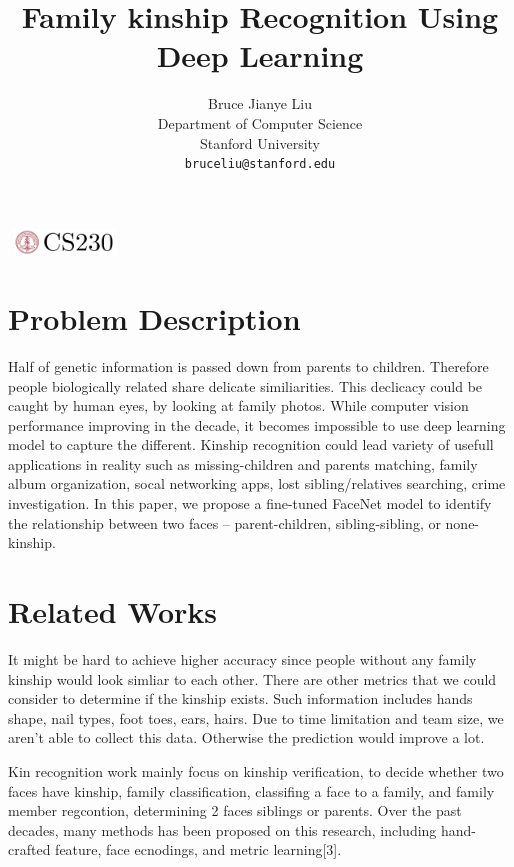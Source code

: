\documentclass{article}
\title{Family kinship Recognition Using Deep Learning}
\author{
  Bruce Jianye Liu\\
  Department of Computer Science\\
  Stanford University\\
  \texttt{bruceliu@stanford.edu} \\
}
\begin{document}

\begin{center}
\includegraphics[width=3cm, height=0.7cm]{CS230}
\end{center}

\maketitle

\section{Problem Description}
Half of genetic information is passed down from parents to children. Therefore
people biologically related share delicate similiarities. This declicacy could
be caught by human eyes, by looking at family photos. While computer vision
performance improving in the decade, it becomes impossible to use deep learning
model to capture the different. Kinship recognition could lead variety of
usefull applications in reality such as missing-children and parents matching,
family album organization, socal networking apps, lost sibling/relatives
searching, crime investigation. In this paper, we propose a fine-tuned FaceNet
model to identify the relationship between two faces -- parent-children, sibling-sibling, or none-kinship.

\section{Related Works}

It might be hard to achieve higher accuracy since people without any family
kinship would look simliar to each other. There are other metrics that we could
consider to determine if the kinship exists. Such information includes hands
shape, nail types, foot toes, ears, hairs. Due to time limitation and team
size, we aren't able to collect this data. Otherwise the prediction would
improve a lot.

Kin recognition work mainly focus on kinship verification, to decide whether
two faces have kinship, family classification, classifing a face to a family,
and family member regcontion, determining 2 faces siblings or parents. Over the
past decades, many methods has been proposed on this research, including
hand-crafted feature, face ecnodings, and metric learning[3].
\end{document}
